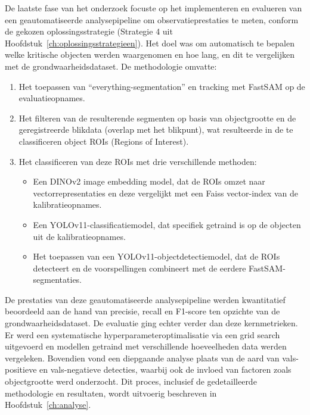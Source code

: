 De laatste fase van het onderzoek focuste op het implementeren en evalueren van een geautomatiseerde analysepipeline om observatieprestaties te meten, 
conform de gekozen oplossingsstrategie (Strategie 4 uit Hoofdstuk~\ref{ch:oplossingsstrategieen}). 
Het doel was om automatisch te bepalen welke kritische objecten werden waargenomen en hoe lang, en dit te vergelijken met de grondwaarheidsdataset. 
De methodologie omvatte:
\begin{enumerate}
  \item Het toepassen van ``everything-segmentation'' en tracking met FastSAM op de evaluatieopnames.
  \item Het filteren van de resulterende segmenten op basis van objectgrootte en de geregistreerde 
  blikdata (overlap met het blikpunt), wat resulteerde in de te classificeren object ROIs (Regions of Interest).
  \item Het classificeren van deze ROIs met drie verschillende methoden: 
  \begin{itemize}
    \item Een DINOv2 image embedding model, dat de ROIs omzet naar vectorrepresentaties en deze vergelijkt met een Faiss vector-index van de kalibratieopnames.
    \item Een YOLOv11-classificatiemodel, dat specifiek getraind is op de objecten uit de kalibratieopnames.
    \item Het toepassen van een YOLOv11-objectdetectiemodel, dat de ROIs detecteert en de voorspellingen combineert met de eerdere FastSAM-segmen\-taties.
  \end{itemize}
\end{enumerate}
De prestaties van deze geautomatiseerde analysepipeline werden kwantitatief beoordeeld aan de hand van precisie, 
recall en F1-score ten opzichte van de grondwaarheidsdataset. 
De evaluatie ging echter verder dan deze kernmetrieken. 
Er werd een systematische hyperparameteroptimalisatie via een grid search uitgevoerd en modellen 
getraind met verschillende hoeveelheden data werden vergeleken. 
Bovendien vond een diepgaande analyse plaats van de aard van vals-positieve en vals-negatieve detecties, 
waarbij ook de invloed van factoren zoals objectgrootte werd onderzocht. 
Dit proces, inclusief de gedetailleerde methodologie en resultaten, wordt uitvoerig beschreven in Hoofdstuk~\ref{ch:analyse}.